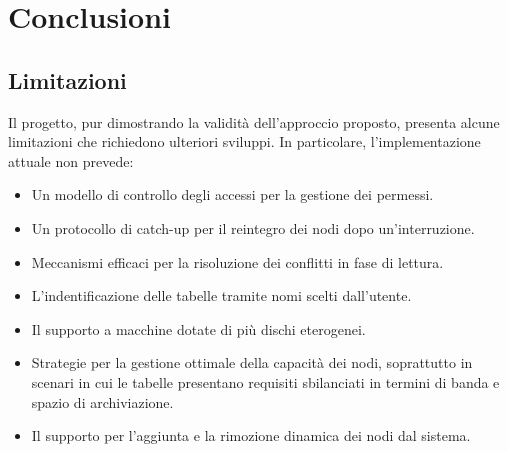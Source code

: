 \section{Conclusioni}
\label{sec:conclusioni}


\subsection{Limitazioni}
\label{subsec:limitazioni}

Il progetto, pur dimostrando la validità dell'approccio proposto, presenta alcune limitazioni che richiedono ulteriori sviluppi. In particolare, l'implementazione attuale non prevede:

\begin{itemize}
    \item Un modello di controllo degli accessi per la gestione dei permessi.
    \item Un protocollo di catch-up per il reintegro dei nodi dopo un'interruzione.
    \item Meccanismi efficaci per la risoluzione dei conflitti in fase di lettura.
    \item L'indentificazione delle tabelle tramite nomi scelti dall'utente.
    \item Il supporto a macchine dotate di più dischi eterogenei.
    \item Strategie per la gestione ottimale della capacità dei nodi, soprattutto in scenari in cui le tabelle presentano requisiti sbilanciati in termini di banda e spazio di archiviazione.
    \item Il supporto per l'aggiunta e la rimozione dinamica dei nodi dal sistema.
\end{itemize}
